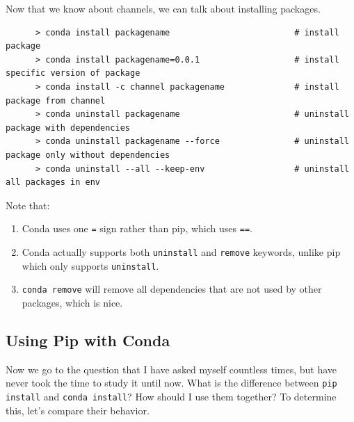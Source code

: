  \begin{example}
    \label{ex:manage-packages-inside-conda-envs}
    Now that we know about channels, we can talk about installing packages. 
    \begin{lstlisting}
      > conda install packagename                         # install package 
      > conda install packagename=0.0.1                   # install specific version of package
      > conda install -c channel packagename              # install package from channel
      > conda uninstall packagename                       # uninstall package with dependencies
      > conda uninstall packagename --force               # uninstall package only without dependencies
      > conda uninstall --all --keep-env                  # uninstall all packages in env
    \end{lstlisting}
    Note that: 
    \begin{enumerate}
      \item Conda uses one \texttt{=} sign rather than pip, which uses \texttt{==}. 
      \item Conda actually supports both \texttt{uninstall} and \texttt{remove} keywords, unlike pip which only supports \texttt{uninstall}. 
      \item \texttt{conda remove} will remove all dependencies that are not used by other packages, which is nice. 
    \end{enumerate}
  \end{example}

\subsection{Using Pip with Conda} 

  Now we go to the question that I have asked myself countless times, but have never took the time to study it until now. What is the difference between \texttt{pip install} and \texttt{conda install}? How should I use them together? To determine this, let's compare their behavior.  

